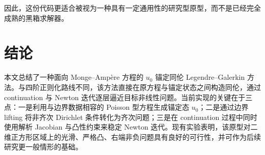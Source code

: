 \documentclass[11pt,a4paper]{article}
\begin{document}
因此，这份代码更适合被视为一种具有一定通用性的研究型原型，而不是已经完全成熟的黑箱求解器。

\section{结论}
本文总结了一种面向 Monge--Amp\`ere 方程的 $u_0$ 锚定同伦 Legendre--Galerkin 方法。与四阶正则化路线不同，该方法直接在原方程与锚定状态之间构造同伦，通过 continuation 与 Newton 迭代逐层逼近目标非线性问题。当前实现的关键在于三点：一是利用与边界数据相容的 Poisson 型方程生成锚定态 $u_0$；二是通过边界 lifting 将非齐次 Dirichlet 条件转化为齐次问题；三是在 continuation 过程中同时使用解析 Jacobian 与凸性约束来稳定 Newton 迭代。现有实验表明，该原型对二维正方形区域上的光滑、严格凸、右端非负问题具有良好的可行性，并可作为后续研究更一般情形的基础。
\end{document}
